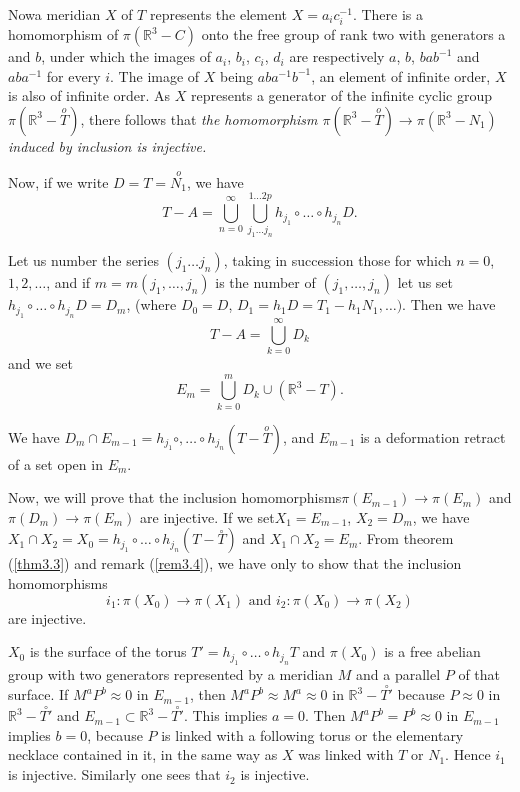 Now\pageoriginale a meridian $X$ of $T$ represents the element $X= a_i
c^{-1}_i$. There is a homomorphism of $\pi (\mathbb{R}^3 -C)$ onto the
free group of rank two with generators a and $b$, under which the
images of $a_i$, $b_i$, $c_i$, $d_i$ are respectively $a$, $b$,
$bab^{-1}$ and $aba^{-1}$ for every $i$. The image of $X$ being
$aba^{-1} b^{-1}$, an element of infinite order, $X$ is also of
infinite order. As $X$ represents a generator of the infinite cyclic
group $\pi(\mathbb{R}^3 -\overset{o}{T})$, there follows that \textit{the
  homomorphism $\pi (\mathbb{R}^3 - \overset{o}{T}) \to \pi (\mathbb{R}^3 -N_1)$
  induced by inclusion is injective.} 

Now, if we write $D= T = \overset{o}{N_1}$, we have  
$$
T- A = \bigcup^{\infty}_{n=0} \bigcup^{1 \ldots 2p}_{j_1 \ldots j_n}
h_{j_{1}} \circ  \ldots \circ  h_{j_{n}} D. 
$$

\noindent
Let us number the series $(j_1 \ldots j_n)$, taking in succession
those for which $n= 0$, $1, 2, \ldots$, and if $m = m (j_1, \ldots,
j_n)$ is the number of $(j_1, \ldots, j_n)$ let us set $h_{j_{1}} \circ
\ldots \circ h_{j_{n}} D= D_m$, (where $D_0 = D$, $D_1 = h_1 D= T_1 - h_1
N_1, \ldots)$. Then we have  
$$
T- A= \bigcup^{\infty}_{k=0} D_k 
$$
and we set 
$$
E_m = \bigcup^m_{k=0} D_k \cup (\mathbb{R}^3 -T). 
$$

\noindent
We have $D_m \cap E_{m-1} = h_{j_{1}} \circ, \ldots \circ h_{j_{n}} (T -
\overset{o}{T})$, and $E_{m-1}$ is a deformation retract of a set open
in $E_m$. 

Now, we will prove that the inclusion homomorphisms$ \pi (E_{m-1}) \to
\pi(E_m)$ and $\pi(D_m) \to \pi (E_m)$ are injective. If we
set\pageoriginale $X_1 = 
E_{m-1}$, $X_2 = D_m$, we have $X_1 \cap X_2 = X_0 = h_{j_{1}} \circ
\ldots \circ h_{j_{n}} (T - \overset{\circ}{T})$ and $X_1 \cap X_2 =
E_m$. From theorem (\ref{thm3.3}) and remark (\ref{rem3.4}), 
we have only to show that the inclusion homomorphisms  
$$
i_1 : \pi(X_0) \to \pi(X_1) \text{ and } i_2 : \pi(X_0) \to \pi(X_2) 
$$
are injective.

$X_0$ is the surface of the torus $T' = h_{j_{1}} \circ \ldots \circ h_{j_{n}}
T$ and $\pi(X_0)$ is a free abelian group with two generators
represented by a meridian $M$ and a parallel $P$ of that surface. If
$M^a P^b \approx 0$ in $E_{m-1}$, then $M^a P^b \approx M^a \approx 0$
in $\mathbb{R}^3 - \overset{\circ}{T'}$ because $P \approx 0$ in
$\mathbb{R}^3 - \overset{\circ}{T'}$ and $E_{m - 1}
\subset \mathbb{R}^3 - \overset{\circ}{T'}$. This implies $a= 0$. Then
$M^a P^b = P^b \approx 0$ in $E_{m-1}$ implies $b = 0$, because $P$ is
linked with a following torus or the elementary necklace contained in
it, in the same way as $X$ was linked with $T$ or $N_1$. Hence $i_1$
is injective. Similarly one sees that $i_2$ is injective.

